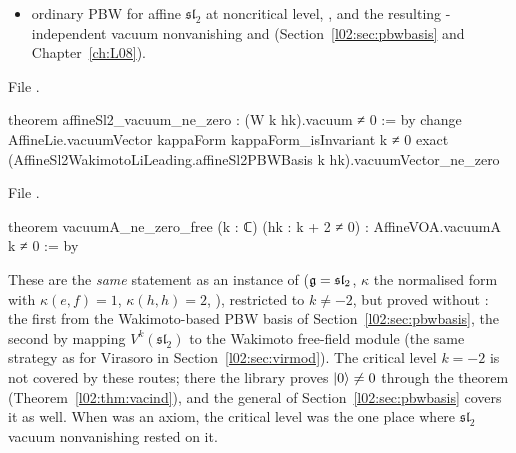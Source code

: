 \begin{itemize}
  preparation, so they are not refereed in this edition);
\item ordinary PBW for affine $\mathfrak{sl}_2$ at noncritical level,
  \allowbreak{}\allowbreak{}\allowbreak{}\allowbreak{}\allowbreak{}, and the resulting -independent vacuum
  nonvanishing \allowbreak{}\allowbreak{}\allowbreak{}\allowbreak{}\allowbreak{}\allowbreak{}\allowbreak{} and
  \allowbreak{}\allowbreak{}\allowbreak{}\allowbreak{}\allowbreak{} (Section~\ref{l02:sec:pbwbasis} and Chapter~\ref{ch:L08}).
\end{itemize}

File .
\begin{leancode}
theorem affineSl2_vacuum_ne_zero : (W k hk).vacuum ≠ 0 := by
  change AffineLie.vacuumVector kappaForm kappaForm_isInvariant k ≠ 0
  exact (AffineSl2WakimotoLiLeading.affineSl2PBWBasis k hk).vacuumVector_ne_zero
\end{leancode}
File .
\begin{leancode}
theorem vacuumA_ne_zero_free (k : ℂ) (hk : k + 2 ≠ 0) : AffineVOA.vacuumA k ≠ 0 := by
\end{leancode}

\begin{dictionary}
These are the \emph{same} statement as an instance of \allowbreak{}\allowbreak{}\allowbreak{}
($\mathfrak{g} = \mathfrak{sl}_2$, $\kappa$ the normalised form  with $\kappa(e,f) = 1$,
$\kappa(h,h) = 2$, ), restricted to $k\ne-2$, but proved without
: the first from the Wakimoto-based PBW basis of Section~\ref{l02:sec:pbwbasis}, the second by
mapping $V^k(\mathfrak{sl}_2)$ to the Wakimoto free-field module (the same strategy as for Virasoro in
Section~\ref{l02:sec:virmod}). The critical level $k=-2$ is not covered by these routes; there the
library proves $|0\rangle\ne0$ through the theorem  (Theorem~\ref{l02:thm:vacind}), and the
general  of Section~\ref{l02:sec:pbwbasis} covers it as well. When  was an
axiom, the critical level was the one place where $\mathfrak{sl}_2$ vacuum nonvanishing rested on it.
\end{dictionary}

